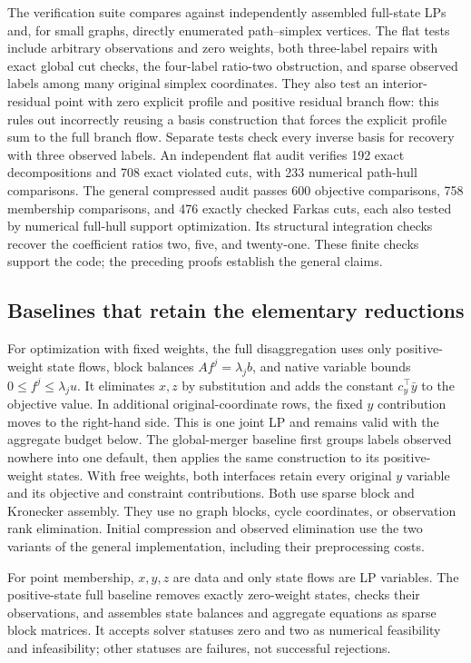 The verification suite compares against independently assembled full-state
LPs and, for small graphs, directly enumerated path--simplex vertices.
The flat tests include arbitrary observations and zero weights,
both three-label repairs with exact global cut checks, the four-label
ratio-two obstruction, and sparse observed labels among many original
simplex coordinates. They also test an interior-residual point with zero
explicit profile and positive residual branch flow: this rules out
incorrectly reusing a basis construction that forces the explicit profile
sum to the full branch flow. Separate tests check every inverse basis for recovery with three
observed labels. An independent flat audit verifies 192 exact
decompositions and 708 exact violated cuts, with 233 numerical path-hull
comparisons. The general compressed audit passes 600 objective comparisons,
758 membership comparisons, and 476 exactly checked Farkas cuts, each also
tested by numerical full-hull support optimization. Its structural integration
checks recover the coefficient ratios two, five, and twenty-one. These finite
checks support the code; the preceding proofs establish the general claims.

\subsection{Baselines that retain the elementary reductions}

For optimization with fixed weights, the full disaggregation uses only
positive-weight state flows, block balances $Af^j=\lambda_j b$, and native
variable bounds $0\le f^j\le\lambda_j u$. It eliminates $x,z$ by substitution
and adds the constant $c_y^\top\bar y$ to the objective value. In additional
original-coordinate rows, the fixed $y$ contribution moves to the right-hand
side. This is one joint LP and remains valid with the aggregate budget below.
The global-merger baseline first groups labels observed nowhere into one
default, then applies the same construction to its positive-weight states.
With free weights, both interfaces retain every original $y$ variable and its
objective and constraint contributions. Both use sparse block and Kronecker
assembly. They use no graph blocks, cycle coordinates, or observation
rank elimination. Initial compression and observed elimination use the two
variants of the general implementation, including their preprocessing costs.

For point membership, $x,y,z$ are data and only state flows are LP variables.
The positive-state full baseline removes exactly zero-weight states, checks their observations, and
assembles state balances and aggregate equations as sparse block matrices.
It accepts solver statuses zero and two as numerical feasibility and
infeasibility; other statuses are failures, not successful rejections.

